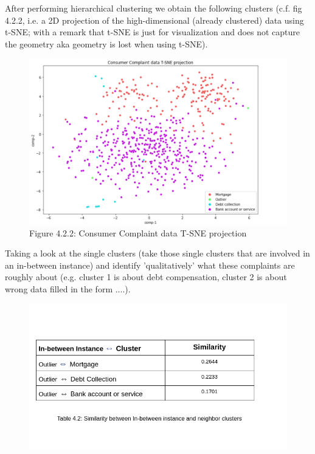 \documentclass[11pt]{article}
\theoremstyle{definition}
\begin{document}
After performing hierarchical clustering we obtain the following clusters (c.f. fig 4.2.2, i.e. a 2D projection of the high-dimensional (already clustered) data using t-SNE; with a remark that t-SNE is just for visualization and does not capture the geometry aka geometry is lost when using t-SNE).
\begin{figure}[H]
\centering
\includegraphics[scale=.55]{images/t-sne.png}\\
Figure 4.2.2: Consumer Complaint data T-SNE projection
\end{figure}

Taking a look at the single clusters (take those single clusters that are involved in an in-between instance) and identify 'qualitatively' what these complaints are roughly about (e.g. cluster 1 is about debt compensation, cluster 2 is about wrong data filled in the form ....). 

\begin{figure}[H]
\centering
\includegraphics[scale=.6]{images/table-consumer.png}\\
\end{figure}
\end{document}
